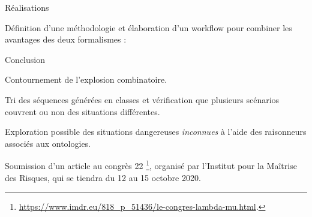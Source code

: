 \documentclass[
  hyperref={
    pdfusetitle,
    pdfencoding=auto,
    psdextra,
    colorlinks=true,
    linkcolor=darkblue,
    citecolor=darkred,
    urlcolor=darkblue,
  },
  9pt,
  aspectratio=169,
]{beamer}
\begin{document}
\begin{frame}[allowframebreaks]{Réalisations}


  Définition d'une méthodologie et élaboration d'un workflow
  pour combiner les avantages des deux formalismes :

  \vspace{1cm}

  \begin{figure}[htb]
    \centering
    \begin{large}
      \begin{tikzpicture}
        
      \end{tikzpicture}
    \end{large}
  \end{figure}

  \alert{Conclusion}

  Contournement de l'explosion combinatoire.

  Tri des séquences générées en classes
  et vérification que plusieurs scénarios couvrent ou non
  des situations différentes.

  Exploration possible des situations dangereuses \emph{inconnues}
  à l'aide des raisonneurs associés aux ontologies.

  Soumission d'un article
  au congrès \textlambda{}\textmu{}22%
  \footnote{\url{https://www.imdr.eu/818_p_51436/le-congres-lambda-mu.html}.},
  organisé par l'Institut pour la Maîtrise des Risques,
  qui se tiendra du \num{12} au \num{15} octobre \num{2020}.

\end{frame}
\end{document}
